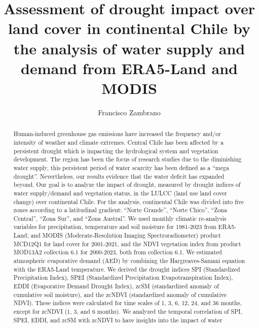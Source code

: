 \documentclass[
  number,
  preprint,
  3p]{elsarticle}
\begin{document}
\begin{frontmatter}
\title{Assessment of drought impact over land cover in continental Chile
by the analysis of water supply and demand from ERA5-Land and MODIS}
\author[1]{Francisco Zambrano%
%
}


        
\begin{abstract}
Human-induced greenhouse gas emissions have increased the frequency
and/or intensity of weather and climate extremes. Central Chile has been
affected by a persistent drought which is impacting the hydrological
system and vegetation development. The region has been the focus of
research studies due to the diminishing water supply, this persistent
period of water scarcity has been defined as a ``mega drought''.
Nevertheless, our results evidence that the water deficit has expanded
beyond. Our goal is to analyze the impact of drought, measured by
drought indices of water supply/demand and vegetation status, in the
LULCC (land use land cover change) over continental Chile. For the
analysis, continental Chile was divided into five zones according to a
latitudinal gradient: ``Norte Grande'', ``Norte Chico'', ``Zona
Central'', ``Zona Sur'', and ``Zona Austral''. We used monthly climatic
re-analysis variables for precipitation, temperature and soil moisture
for 1981-2023 from ERA5-Land; and MODIS (Moderate-Resolution Imaging
Spectroradiometer) product MCD12Q1 for land cover for 2001-2021, and the
NDVI vegetation index from product MOD13A2 collection 6.1 for 2000-2023,
both from collection 6.1. We estimated atmospheric evaporative demand
(AED) by combining the Hargreaves-Samani equation with the ERA5-Land
temperature. We derived the drought indices SPI (Standardized
Precipitation Index), SPEI (Standardized Precipitation
Evapotranspiration Index), EDDI (Evaporative Demand Drought Index), zcSM
(standardized anomaly of cumulative soil moisture), and the zcNDVI
(standardized anomaly of cumulative NDVI). These indices were calculated
for time scales of 1, 3, 6, 12, 24, and 36 months, except for zcNDVI (1,
3, and 6 months). We analyzed the temporal correlation of SPI, SPEI,
EDDI, and zcSM with zcNDVI to have insights into the impact of water

\end{abstract}
\end{frontmatter}
\end{document}
